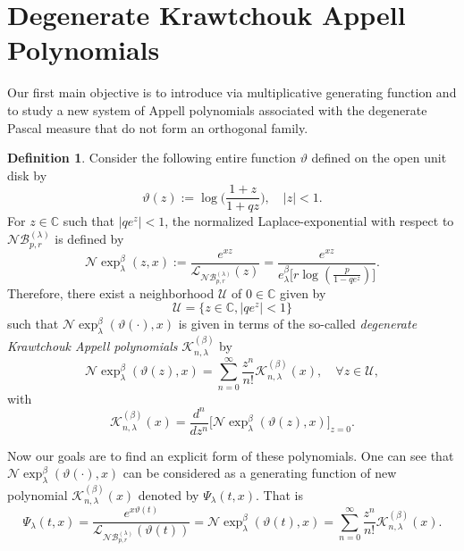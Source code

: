 \documentclass{birkjour}
\theoremstyle{definition}
\newtheorem{defn}[thm]{Definition}
\theoremstyle{remark}
\numberwithin{equation}{section}
\begin{document}
\section{Degenerate Krawtchouk Appell Polynomials}
Our first main objective is to introduce via multiplicative
generating function and to study a new system of Appell polynomials
associated with the degenerate Pascal measure that do not form an
orthogonal family.
\begin{defn}
Consider the following entire function $\vartheta$ defined on the
open unit disk by
$$\vartheta(z):=\log\Big(\frac{1+z}{1+qz}\Big), \quad |z|<1.$$
For $z\in \mathbb{C}$ such that $|qe^{z}|<1$, the normalized
Laplace-exponential with respect to
$\mathcal{N}\mathcal{B}^{(\lambda)}_{p, r}$ is defined by
\begin{equation}\label{wick-exp}
\mathcal{N}\!\exp^{\beta}_{\lambda}(z,
x):=\displaystyle{\frac{e^{xz}}{\mathcal{L}_{\mathcal{N}\mathcal{B}^{(\lambda)}_{p,
r}}(z)}
=\frac{e^{xz}}{e^{\beta}_{\lambda}\big[r\log(\frac{p}{1-qe^{z}})\big]}}.
\end{equation}
Therefore, there exist a neighborhood $\mathcal{U}$ of $0\in
\mathbb{C}$ given by
$$\mathcal{U}=\big\{z\in \mathbb{C}, |qe^{z}|<1\big\}$$
such that $\mathcal{N}\!\exp^{\beta}_{\lambda}(\vartheta(\cdot), x)$
is given in terms of the so-called \textit{degenerate Krawtchouk
Appell polynomials} $\mathcal{K}^{(\beta)}_{n, \lambda}$ by
\begin{equation}\label{Gen-functio-form1}
\mathcal{N}\!\exp^{\beta}_{\lambda}(\vartheta(z),
x)=\displaystyle{\sum^{\infty}_{n=0}\frac{z^{n}}{n!}
\mathcal{K}^{(\beta)}_{n, \lambda}(x), \quad\forall z\in
\mathcal{U}},
\end{equation}
with
$$\mathcal{K}^{(\beta)}_{n, \lambda}(x)=\displaystyle{\frac{d^{n}}{dz^{n}}
\Big[\mathcal{N}\!\exp^{\beta}_{\lambda}(\vartheta(z),
x)\Big]_{z=0}}.$$
\end{defn}
Now our goals are to find an explicit form of these polynomials. One
can see that $\mathcal{N}\!\exp^{\beta}_{\lambda}(\vartheta(\cdot),
x)$ can be considered as a generating function of new polynomial
$\mathcal{K}^{(\beta)}_{n, \lambda}(x)$ denoted by
$\Psi_{\lambda}(t, x)$. That is
\begin{equation}\label{Generatin-form2}
\Psi_{\lambda}(t,
x)=\displaystyle{\frac{e^{x\vartheta(t)}}{\mathcal{L}_{\mathcal{N}\mathcal{B}^{(\lambda)}_{p,
r}}(\vartheta(t))}=\mathcal{N}\!\exp^{\beta}_{\lambda}(\vartheta(t),
x)=\sum^{\infty}_{n=0}\frac{z^{n}}{n!}\mathcal{K}^{(\beta)}_{n,
\lambda}(x)}.
\end{equation}
\end{document}
